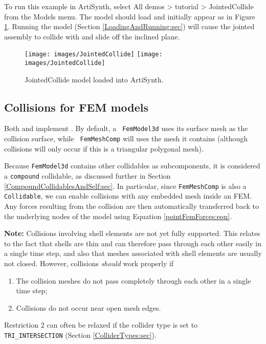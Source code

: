 To run this example in ArtiSynth, select {\sf All demos > tutorial >
JointedCollide} from the {\sf Models} menu. The model should load and
initially appear as in Figure \ref{JointedCollide:fig}.  Running
the model (Section \ref{LoadingAndRunning:sec}) will
cause the jointed assembly to collide with and slide off the inclined
plane.

\begin{figure}[h]
\begin{center}
\iflatexml
 \texttt{[image: images/JointedCollide]}
\else
 \texttt{[image: images/JointedCollide]}
\fi
\end{center}
\caption{JointedCollide model loaded into ArtiSynth.}
\label{JointedCollide:fig}
\end{figure}

\subsection{Collisions for FEM models}
\label{sec:fem:collision}

Both  and
 implement
.  By default, a {\tt
FemModel3d} uses its surface mesh as the collision surface, while {\tt
FemMeshComp} will uses the mesh it contains (although collisions will
only occur if this is a triangular polygonal mesh).

Because {\tt FemModel3d} contains other collidables as subcomponents,
it is considered a {\tt compound} collidable, as discussed further in
Section \ref{CompoundCollidablesAndSelf:sec}. In particular, since
{\tt FemMeshComp} is also a {\tt Collidable}, we can enable collisions
with any embedded mesh inside an FEM.  Any forces resulting from the
collision are then automatically transferred back to the underlying
nodes of the model using Equation \eqref{pointFemForces:eqn}.

\begin{sideblock} {\bf Note:} Collisions involving shell elements are
not yet fully supported.  This relates to the fact that shells are
thin and can therefore pass through each other easily in a single time
step, and also that meshes associated with shell elements are usually
not closed.  However, collisions {\it should} work properly if

\begin{enumerate}

\item The collision meshes do not pass completely through each
other in a single time step;

\item Collisions do not occur near open mesh edges.

\end{enumerate}

Restriction 2 can often be relaxed if the collider type is set to {\tt
TRI\_INTERSECTION} (Section \ref{ColliderTypes:sec}).

\end{sideblock}

